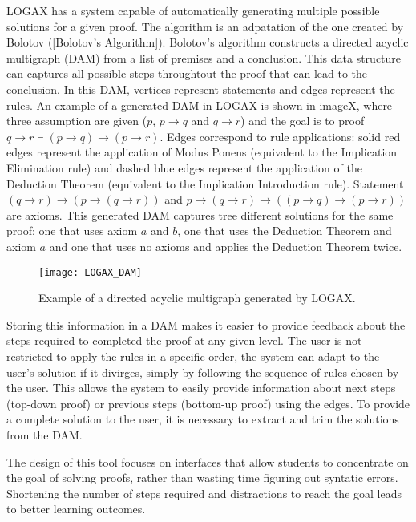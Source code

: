  LOGAX has a system capable of automatically generating multiple possible solutions for a given proof. The algorithm is an adpatation of the one created by Bolotov ([Bolotov's Algorithm]). Bolotov's algorithm constructs a directed acyclic multigraph (DAM) from a list of premises and a conclusion. This data structure can captures all possible steps throughtout the proof that can lead to the conclusion. In this DAM, vertices represent statements and edges represent the rules. An example of a generated DAM in LOGAX is shown in imageX, where three assumption are given (\(p\), \(p \to q\) and \(q \to r\)) and the goal is to proof \( q \to r \vdash (p \to q) \to (p \to r) \). Edges correspond to rule applications: solid red edges represent the application of Modus Ponens (equivalent to the Implication Elimination rule) and dashed blue edges represent the application of the Deduction Theorem (equivalent to the Implication Introduction rule). Statement \((q \to r) \to (p \to (q \to r)) \) and \( p \to (q \to r) \to ((p \to q) \to (p \to r)) \) are axioms. This generated DAM captures tree different solutions for the same proof: one that uses axiom \(a\) and \(b\), one that uses the Deduction Theorem and axiom \(a\) and one that uses no axioms and applies the Deduction Theorem twice. 

\begin{figure}[htbp]
    \centering
    \texttt{[image: LOGAX\_DAM]}
    \caption{Example of a directed acyclic multigraph generated by LOGAX.}
\end{figure}

Storing this information in a DAM makes it easier to provide feedback about the steps required to completed the proof at any given level. The user is not restricted to apply the rules in a specific order, the system can adapt to the user's solution if it divirges, simply by following the sequence of rules chosen by the user. This allows the system to easily provide information about next steps (top-down proof) or previous steps (bottom-up proof) using the edges. To provide a complete solution to the user, it is necessary to extract and trim the solutions from the DAM. 

The design of this tool focuses on interfaces that allow students to concentrate on the goal of solving proofs, rather than wasting time figuring out syntatic errors. Shortening the number of steps required and distractions to reach the goal leads to better learning outcomes.

